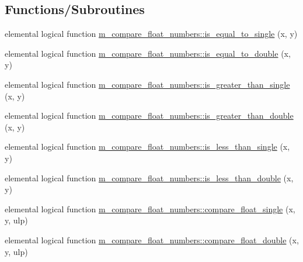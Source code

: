 \subsection*{Functions/\+Subroutines}
\begin{DoxyCompactItemize}
\item 
elemental logical function \hyperlink{namespacem__compare__float__numbers_a77dbaa3c42872d0366a3c5c2d99664d2}{m\+\_\+compare\+\_\+float\+\_\+numbers\+::is\+\_\+equal\+\_\+to\+\_\+single} (x, y)
\item 
elemental logical function \hyperlink{namespacem__compare__float__numbers_a086e7c43d2dca1f8238afd6548e2704e}{m\+\_\+compare\+\_\+float\+\_\+numbers\+::is\+\_\+equal\+\_\+to\+\_\+double} (x, y)
\item 
elemental logical function \hyperlink{namespacem__compare__float__numbers_ab525ef9c044e5187643e04c64d470186}{m\+\_\+compare\+\_\+float\+\_\+numbers\+::is\+\_\+greater\+\_\+than\+\_\+single} (x, y)
\item 
elemental logical function \hyperlink{namespacem__compare__float__numbers_ac0b7c9aeec5a785ebff7a6e59ba5fb26}{m\+\_\+compare\+\_\+float\+\_\+numbers\+::is\+\_\+greater\+\_\+than\+\_\+double} (x, y)
\item 
elemental logical function \hyperlink{namespacem__compare__float__numbers_a82b07d4a5f9076d2dc0655c8733549b5}{m\+\_\+compare\+\_\+float\+\_\+numbers\+::is\+\_\+less\+\_\+than\+\_\+single} (x, y)
\item 
elemental logical function \hyperlink{namespacem__compare__float__numbers_a36578a1fa0cf4ee3d29ded529dbd156c}{m\+\_\+compare\+\_\+float\+\_\+numbers\+::is\+\_\+less\+\_\+than\+\_\+double} (x, y)
\item 
elemental logical function \hyperlink{namespacem__compare__float__numbers_a5f413c6822015914ba48d10503f2bb0f}{m\+\_\+compare\+\_\+float\+\_\+numbers\+::compare\+\_\+float\+\_\+single} (x, y, ulp)
\item 
elemental logical function \hyperlink{namespacem__compare__float__numbers_a041bd26aef7f9bbc8eb88b2f39e7755a}{m\+\_\+compare\+\_\+float\+\_\+numbers\+::compare\+\_\+float\+\_\+double} (x, y, ulp)
\end{DoxyCompactItemize}
